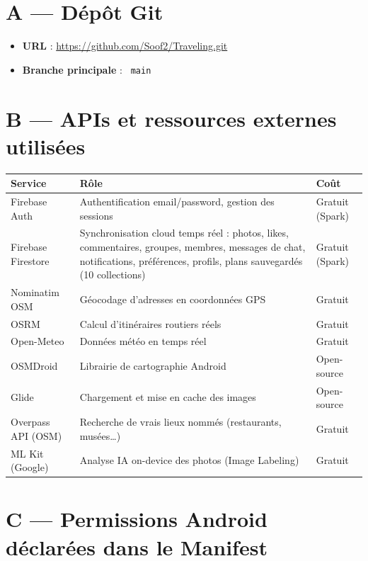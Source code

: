 \documentclass[a4paper,12pt,openany]{report}
\newcommand{\ic}[1]{\texttt{\small\colorbox{lightbg}{\color{navy!90} #1}}}
\begin{document}
\section*{A — Dépôt Git}

\begin{itemize}
  \item \textbf{URL} : \url{https://github.com/Soof2/Traveling.git}
  \item \textbf{Branche principale} : \ic{main}
\end{itemize}

\section*{B — APIs et ressources externes utilisées}

\begin{tabularx}{\textwidth}{l X l}
  \toprule
  \textbf{Service} & \textbf{Rôle} & \textbf{Coût} \\
  \midrule
  Firebase Auth      & Authentification email/password, gestion des sessions
                     & Gratuit (Spark) \\
  Firebase Firestore & Synchronisation cloud temps réel : photos, likes, commentaires,
                       groupes, membres, messages de chat, notifications, préférences,
                       profils, plans sauvegardés (10 collections)
                     & Gratuit (Spark) \\
  Nominatim OSM      & Géocodage d'adresses en coordonnées GPS
                     & Gratuit \\
  OSRM               & Calcul d'itinéraires routiers réels
                     & Gratuit \\
  Open-Meteo         & Données météo en temps réel
                     & Gratuit \\
  OSMDroid           & Librairie de cartographie Android
                     & Open-source \\
  Glide              & Chargement et mise en cache des images
                     & Open-source \\
  Overpass API (OSM) & Recherche de vrais lieux nommés (restaurants, musées…)
                     & Gratuit \\
  ML Kit (Google)    & Analyse IA on-device des photos (Image Labeling)
                     & Gratuit \\
  \bottomrule
\end{tabularx}

\section*{C — Permissions Android déclarées dans le Manifest}
\end{document}
